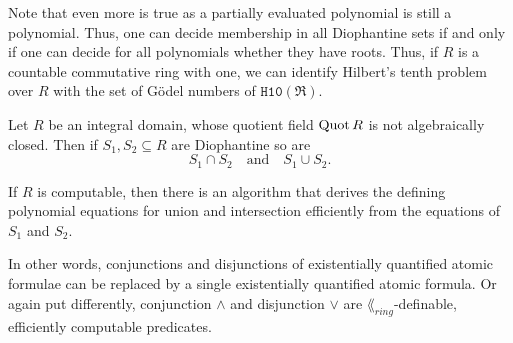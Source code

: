 Note that even more is true as a partially evaluated polynomial is still a
polynomial. Thus, one can decide membership in all Diophantine sets if and only
if one can decide for all polynomials whether they have roots. Thus, if \(R\) is
a countable commutative ring with one, we can identify Hilbert's tenth problem
over \(R\) with the set of Gödel numbers of \(\mathtt{H10}(\mathfrak{R})\).

\begin{lem}\label{lem:intersections and unions}
    Let \(R\) be an integral domain, whose quotient field \(\operatorname{Quot} R\) is not
    algebraically closed. Then if \(S_1, S_2 \subseteq R\) are Diophantine so are
    \[
      S_1 ∩ S_2 \quad \text{and} \quad S_1 ∪ S_2.
    \]

    If \(R\) is computable, then there is an algorithm that derives the defining
    polynomial equations for union and intersection efficiently from the
    equations of \(S_1\) and \(S_2\).
\end{lem}

In other words, conjunctions and disjunctions of existentially quantified atomic
formulae can be replaced by a single existentially quantified atomic formula. Or
again put differently, conjunction \(∧\) and disjunction \(∨\) are
\(\lang_{ring}\)-definable, efficiently computable predicates.

